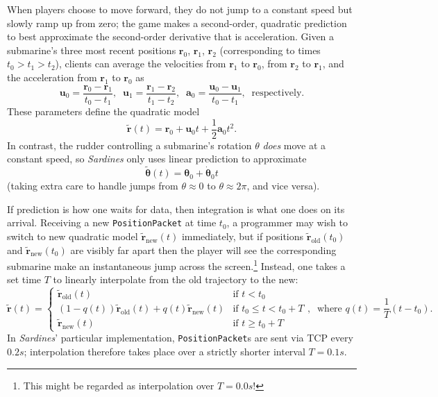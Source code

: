 \documentclass[a4paper, 9pt]{article}
\begin{document}
\begin{flushleft}
\vspace{5pt}\noindent
When players choose to move forward, they do not jump to a constant speed but slowly ramp up from zero; the game makes a second-order, quadratic prediction to best approximate the second-order derivative that is acceleration. Given a submarine's three most recent positions $\mathbf{r}_0$, $\mathbf{r}_1$, $\mathbf{r}_2$ (corresponding to times $t_0 > t_1 > t_2$), clients can average the velocities from $\mathbf{r}_1$ to $\mathbf{r}_0$, from $\mathbf{r}_2$ to $\mathbf{r}_1$, and the acceleration from $\mathbf{r}_1$ to $\mathbf{r}_0$ as
$$\mathbf{u}_0 = \frac{\mathbf{r}_0-\mathbf{r}_1}{t_0-t_1}, \;\; \mathbf{u}_1 = \frac{\mathbf{r}_1-\mathbf{r}_2}{t_1-t_2}, \;\; \mathbf{a}_0 = \frac{\mathbf{u}_0-\mathbf{u}_1}{t_0-t_1}, \;\; \textrm{respectively.}$$
These parameters define the quadratic model
$$ \mathbf{\tilde{r}}(t) = \mathbf{r}_0+\mathbf{u}_0t+\frac{1}{2}\mathbf{a}_0t^2.$$
In contrast, the rudder controlling a submarine's rotation $\theta$ \textit{does} move at a constant speed, so \textit{Sardines} only uses linear prediction to approximate
$$\mathbf{\tilde{\theta}}(t) = \mathbf{\theta}_0+\mathbf{\dot{\theta}}_0t$$
(taking extra care to handle jumps from $\theta \approx 0$ to $\theta \approx 2\pi$, and vice versa).


\vspace{5pt}\noindent
If prediction is how one waits for data, then integration is what one does on its arrival. Receiving a new \texttt{PositionPacket} at time $t_0$, a programmer may wish to switch to new quadratic model $\mathbf{\tilde{r}}_{\textrm{new}}(t)$ immediately, but if positions $\mathbf{\tilde{r}}_{\textrm{old}}(t_0)$ and $\mathbf{\tilde{r}}_{\textrm{new}}(t_0)$ are visibly far apart then the player will see the corresponding submarine make an instantaneous jump across the screen.\footnote{This might be regarded as interpolation over $T = 0.0s$!} Instead, one takes a set time $T$ to linearly interpolate from the old trajectory to the new:
$$\mathbf{\tilde{r}}(t) = \begin{cases} 
\mathbf{\tilde{r}}_{\textrm{old}}(t) & \textrm{if $t < t_0$} \\
(1-q(t))\mathbf{\tilde{r}}_{\textrm{old}}(t) + q(t)\mathbf{\tilde{r}}_{\textrm{new}}(t) & \textrm{if $t_0 \leq t < t_0+T$} \\
\mathbf{\tilde{r}}_{\textrm{new}}(t) & \textrm{if $t \geq t_0+T$}
\end{cases}, \;\; \textrm{where $q(t) = \frac{1}{T}\left(t-t_0\right)$.}$$
In \textit{Sardines}' particular implementation, \texttt{PositionPacket}s are sent via TCP every $0.2s$; interpolation therefore takes place over a strictly shorter interval $T = 0.1s$. 


\end{flushleft}
\end{document}
